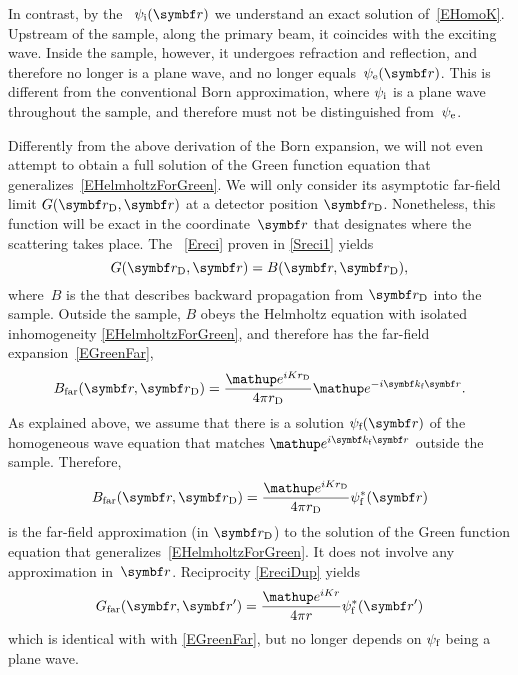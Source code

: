 In contrast, by the ~$\psi_\si(\r)$
%
%
%
we understand an exact solution of~\cref{EHomoK}.
Upstream of the sample, along the primary beam, it coincides with the exciting wave.
Inside the sample, however, it undergoes refraction and reflection,
and therefore no longer is a plane wave, and no longer equals~$\psi_\se(\r)$.
This is different from the conventional Born approximation,
where $\psi_{\text{i}}$ is a plane wave throughout the sample,
and therefore must not be distinguished from~$\psi_{\text{e}}$.

Differently from the above derivation of the Born expansion,
we will not even attempt to obtain a full solution
%
of the Green function equation that generalizes~\cref{EHelmholtzForGreen}.
We will only consider its asymptotic far-field limit $G(\rD,\r)$
at a detector position $\rD$.
Nonetheless, this function will be exact in the coordinate~$\r$
that designates where the scattering takes place.
%
The ~\cref{Ereci}
%
proven in \cref{Sreci1}
yields
\begin{equation}\label{EreciDup}
  G(\rD,\r) = B(\r,\rD),
\end{equation}
%
where~$B$ is the 
that describes backward propagation from $\rD$ into the sample.
Outside the sample,
$B$ obeys the Helmholtz equation
with isolated inhomogeneity \cref{EHelmholtzForGreen},
and therefore has the far-field expansion~\cref{EGreenFar},
%
\begin{equation}\label{EBFar}
  B_\text{far}(\r,\rD)
  =\frac{\e^{iKr_\text{D}}}{4\pi r_\text{D}}\e^{-i\k_\tf \r}.
\end{equation}
As explained above,
we assume that there is a solution $\psi_\sf(\r)$ of the homogeneous
wave equation that matches $\e^{i\k_\tf \r}$ outside the sample.
Therefore,
\begin{equation}\label{EBFull}
  B_\text{far}(\r,\rD)
  = \frac{\e^{iKr_\text{D}}}{4\pi r_\text{D}}\psi^*_\tf(\r)
\end{equation}
is the far-field approximation (in $\rD$)
to the solution of the Green function equation that generalizes~\cref{EHelmholtzForGreen}.
It does not involve any approximation in~$\r$.
Reciprocity \cref{EreciDup} yields
\begin{equation}\label{EGreenFarDWBA}
  G_\text{far}(\r,\r')
  = \frac{\e^{iKr}}{4\pi r}\psi^*_\tf(\r')
\end{equation}
which is identical with with \cref{EGreenFar},
but no longer depends on $\psi_{\text{f}}$ being a plane wave.

